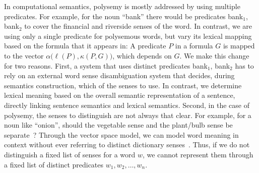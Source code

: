 In computational semantics, polysemy is mostly addressed by using multiple
predicates. For example, for the noun ``bank'' there would be predicates
bank$_1$, bank$_2$ to cover the financial and riverside senses of the word. In
contrast, we are using only a single predicate for polysemous words, but vary
its lexical mapping based on the formula that it appears in: A predicate $P$ in
a formula $G$ is mapped to the vector $\alpha\big(\ell(P), \kappa(P, G)\big)$,
which depends on $G$. We make this change for two reasons. First, a system that
uses distinct predicates bank$_1$, bank$_2$ has to rely on an external word
sense disambiguation system that decides, during semantics construction, which
of the senses to use. In contrast, we determine lexical meaning based on the
overall semantic representation of a sentence, directly linking sentence
semantics and lexical semantics. Second, in the case of polysemy, the senses to
distinguish are not always that clear. For example, for a noun like ``onion'',
should the vegetable sense and the plant/bulb sense be
separate~\citep{krishnamurthy:chj2000}? Through the vector space model, we
can model word meaning in context without ever referring to distinct dictionary
senses~\citep{erk:gems2010}. 
Thus, if we do not distinguish a fixed list of senses for a word $w$, we cannot
represent them through a fixed list of distinct predicates $w_1, w_2, \ldots, w_n$.

